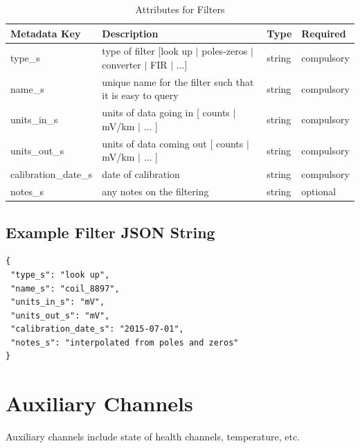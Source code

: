 \documentclass{article}
\begin{document}
\begin{table}[htb!]
	\caption[Attributes for Filter]{Attributes for Filters}
	\begin{tabular}{|l|p{3.5in}|l|l|}
		\hline
		\textbf{Metadata Key} & \textbf{Description} & \textbf{Type} & \textbf{Required} \\ \hline
		type\_s & type of filter [look up $|$ poles-zeros $|$ converter $|$ FIR $|$ ...]& string &  compulsory \\ \hline
		name\_s & unique name for the filter such that it is easy to query & string & compulsory \\ \hline
		units\_in\_s & units of data going in [ counts $|$ mV/km $|$ ... ] & string & compulsory \\ \hline
		units\_out\_s & units of data coming out [ counts $|$ mV/km $|$ ... ] & string & compulsory \\ \hline
		calibration\_date\_s & date of calibration & string &  compulsory \\ \hline
		notes\_s & any notes on the filtering & string &  optional \\ \hline
	\end{tabular}
	\label{tab:filter}
\end{table}

\subsection{Example Filter JSON String} 

\begin{verbatim}
{
 "type_s": "look up",
 "name_s": "coil_8897",
 "units_in_s": "mV",
 "units_out_s": "mV",
 "calibration_date_s": "2015-07-01",
 "notes_s": "interpolated from poles and zeros"
}
\end{verbatim}

\newpage

\section{Auxiliary Channels}

Auxiliary channels include state of health channels, temperature, etc.  
\end{document}

